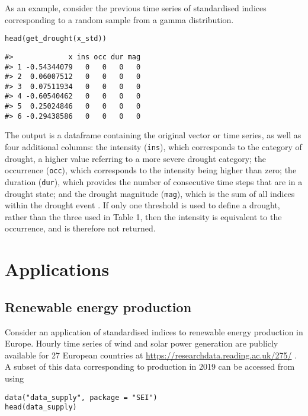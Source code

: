 As an example, consider the previous time series of standardised indices corresponding to a random sample from a gamma distribution.

\begin{verbatim}
head(get_drought(x_std))
\end{verbatim}

\begin{verbatim}
#>             x ins occ dur mag
#> 1 -0.54344079   0   0   0   0
#> 2  0.06007512   0   0   0   0
#> 3  0.07511934   0   0   0   0
#> 4 -0.60540462   0   0   0   0
#> 5  0.25024846   0   0   0   0
#> 6 -0.29438586   0   0   0   0
\end{verbatim}

The output is a dataframe containing the original vector or time series, as well as four additional columns: the intensity (\texttt{ins}), which corresponds to the category of drought, a higher value referring to a more severe drought category; the occurrence (\texttt{occ}), which corresponds to the intensity being higher than zero; the duration (\texttt{dur}), which provides the number of consecutive time steps that are in a drought state; and the drought magnitude (\texttt{mag}), which is the sum of all indices within the drought event \citep[see][for details]{MckeeEtAl1993}. If only one threshold is used to define a drought, rather than the three used in Table 1, then the intensity is equivalent to the occurrence, and is therefore not returned.

\hypertarget{applications}{%
\section{Applications}\label{applications}}

\hypertarget{renewable-energy-production}{%
\subsection{Renewable energy production}\label{renewable-energy-production}}

Consider an application of standardised indices to renewable energy production in Europe. Hourly time series of wind and solar power generation are publicly available for 27 European countries at \url{https://researchdata.reading.ac.uk/275/} \citep[see][for details]{BloomfieldEtAl2020}. A subset of this data corresponding to production in 2019 can be accessed from  using

\begin{verbatim}
data("data_supply", package = "SEI")
head(data_supply)
\end{verbatim}

